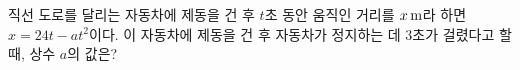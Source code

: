 직선 도로를 달리는 자동차에 제동을 건 후 $t$초 동안 움직인 거리를 $x\mkern3mu \mathrm{m}$라 하면 $x=24t-at^2$이다. 이 자동차에 제동을 건 후 자동차가 정지하는 데 3초가 걸렸다고 할 때, 상수 $a$의 값은?
